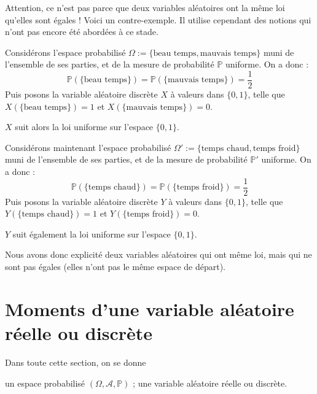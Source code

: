 \documentclass[../integ-proba.tex]{subfiles}
\begin{document}
    \begin{rem}
        Attention, ce n'est pas parce que deux variables aléatoires ont la même loi qu'elles sont égales !
        Voici un contre-exemple.
        Il utilise cependant des notions qui n'ont pas encore été abordées à ce stade.

        Considérons l'espace probabilisé $\Omega := \{\text{beau temps}, \text{mauvais temps}\}$ muni de l'ensemble de ses parties, et de la mesure de probabilité $\mathbb{P}$ uniforme.
        On a donc :
        \begin{displaymath}
            \mathbb{P}(\{\text{beau temps}\}) = \mathbb{P}(\{\text{mauvais temps}\}) = \frac{1}{2}
        \end{displaymath}
        Puis posons la variable aléatoire discrète $X$ à valeurs dans $\{0,1\}$, telle que $X(\{\text{beau temps}\})=1$ et $X(\{\text{mauvais temps}\})=0$.

        $X$ suit alors la loi uniforme sur l'espace $\{0,1\}$.

        Considérons maintenant l'espace probabilisé $\Omega' := \{\text{temps chaud}, \text{temps froid}\}$ muni de l'ensemble de ses parties, et de la mesure de probabilité $\mathbb{P}'$ uniforme.
        On a donc :
        \begin{displaymath}
            \mathbb{P}(\{\text{temps chaud}\}) = \mathbb{P}(\{\text{temps froid}\}) = \frac{1}{2}
        \end{displaymath}
        Puis posons la variable aléatoire discrète $Y$ à valeurs dans $\{0,1\}$, telle que $Y(\{\text{temps chaud}\})=1$ et $Y(\{\text{temps froid}\})=0$.

        $Y$ suit également la loi uniforme sur l'espace $\{0,1\}$.

        Nous avons donc explicité deux variables aléatoires qui ont même loi, mais qui ne sont pas égales (elles n'ont pas le même espace de départ).
    \end{rem}

    \section{Moments d'une variable aléatoire réelle ou discrète}

    Dans toute cette section, on se donne
    \begin{itemize}
        \itemb un espace probabilisé $\left(\Omega, \mathcal{A}, \mathbb{P}\right)$ ;
        \itemb une variable aléatoire réelle ou discrète.
    \end{itemize}
\end{document}
